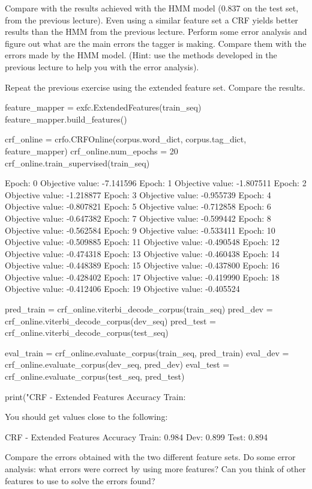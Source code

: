 Compare with the results achieved with the HMM model (0.837 on the test set, from the previous lecture). Even using a similar feature set a CRF yields better
results than the HMM from the previous lecture. 
Perform some error analysis and figure out what are the main
errors the tagger is making. Compare them with the errors made
by the HMM model. (Hint: use the methods developed in the previous
lecture to help you with the error analysis).


\begin{exercise}\label{exer:crf2}
Repeat the previous exercise using the extended feature set. Compare the results.

\begin{python}
feature_mapper = exfc.ExtendedFeatures(train_seq)
feature_mapper.build_features()

crf_online = crfo.CRFOnline(corpus.word_dict, corpus.tag_dict, feature_mapper)
crf_online.num_epochs = 20
crf_online.train_supervised(train_seq)

Epoch: 0 Objective value: -7.141596
Epoch: 1 Objective value: -1.807511
Epoch: 2 Objective value: -1.218877
Epoch: 3 Objective value: -0.955739
Epoch: 4 Objective value: -0.807821
Epoch: 5 Objective value: -0.712858
Epoch: 6 Objective value: -0.647382
Epoch: 7 Objective value: -0.599442
Epoch: 8 Objective value: -0.562584
Epoch: 9 Objective value: -0.533411
Epoch: 10 Objective value: -0.509885
Epoch: 11 Objective value: -0.490548
Epoch: 12 Objective value: -0.474318
Epoch: 13 Objective value: -0.460438
Epoch: 14 Objective value: -0.448389
Epoch: 15 Objective value: -0.437800
Epoch: 16 Objective value: -0.428402
Epoch: 17 Objective value: -0.419990
Epoch: 18 Objective value: -0.412406
Epoch: 19 Objective value: -0.405524

pred_train = crf_online.viterbi_decode_corpus(train_seq)
pred_dev = crf_online.viterbi_decode_corpus(dev_seq)
pred_test = crf_online.viterbi_decode_corpus(test_seq)

eval_train = crf_online.evaluate_corpus(train_seq, pred_train)
eval_dev = crf_online.evaluate_corpus(dev_seq, pred_dev)
eval_test = crf_online.evaluate_corpus(test_seq, pred_test)

print("CRF - Extended Features Accuracy Train: %
\end{python}

You should get values close to the following:
\begin{python}
CRF - Extended Features Accuracy Train: 0.984 Dev: 0.899 Test: 0.894
\end{python}


Compare the errors obtained with the two different feature
sets. Do some error analysis: what errors were correct by using
more features? Can you think of other features to use to solve the
errors found?
\end{exercise}

